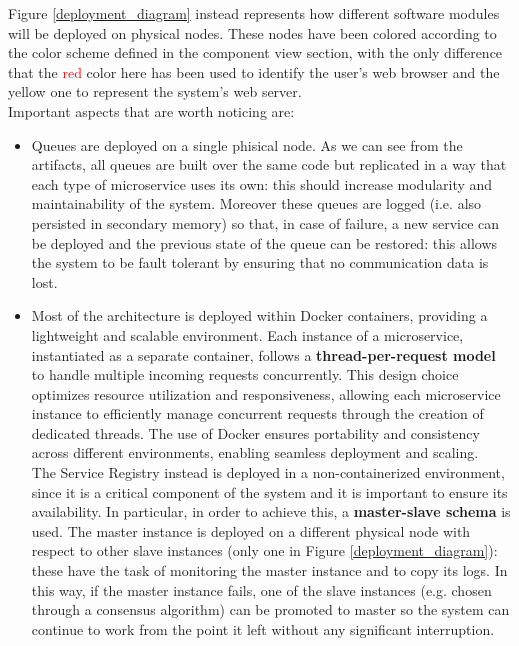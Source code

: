 Figure \ref{deployment_diagram} instead represents how different software modules will be deployed on physical nodes. These nodes have been colored according to the color scheme defined in the component view section, with the only difference that the \textcolor{red}{red} color here has been used to identify the user's web browser and the \textcolor{myyellow}{yellow} one to represent the system's web server.\\ Important aspects that are worth noticing are:
\begin{itemize}
    \item Queues are deployed on a single phisical node. As we can see from the artifacts, all queues are built over the same code but replicated in a way that each type of microservice uses its own: this should increase modularity and maintainability of the system. Moreover these queues are logged (i.e. also persisted in secondary memory) so that, in case of failure, a new service can be deployed and the previous state of the queue can be restored: this allows the system to be fault tolerant by ensuring that no communication data is lost.
    \item Most of the architecture is deployed within Docker containers, providing a lightweight and scalable environment. Each instance of a microservice, instantiated as a separate container, follows a \textbf{thread-per-request model} to handle multiple incoming requests concurrently. This design choice optimizes resource utilization and responsiveness, allowing each microservice instance to efficiently manage concurrent requests through the creation of dedicated threads. The use of Docker ensures portability and consistency across different environments, enabling seamless deployment and scaling.\\ 
          The Service Registry instead is deployed in a non-containerized environment, since it is a critical component of the system and it is important to ensure its availability. In particular, in order to achieve this, a \textbf{master-slave schema} is used. The master instance is deployed on a different physical node with respect to other slave instances (only one in Figure \ref{deployment_diagram}): these have the task of monitoring the master instance and to copy its logs. In this way, if the master instance fails, one of the slave instances (e.g. chosen through a consensus algorithm) can be promoted to master so the system can continue to work from the point it left without any significant interruption.
\end{itemize}

